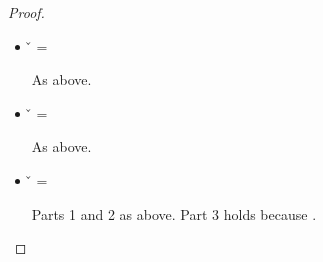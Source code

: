 \begin{lemma}
\begin{proof}
\begin{case}[T-App]
\begin{itemize}
\begin{subcase}[B-Delta]
\begin{itemize}
\begin{subcase}[\const{} = \classconst]
\begin{itemize}
\begin{subcase}[\v{2} = {\closure {\openv{}} {\abs {\x{}} {\t{}} {\e{}}}}]
              As above.
                  \end{subcase}
          \item[] \begin{subcase}[\v{2} = {\multi {\v{d}} {\disptable{}}}] \v{} = \HMapInstance{}


              As above.
                  \end{subcase}
          \item[] \begin{subcase}[\v{2} = {\curlymapvaloverright{\v{1}}{\v{2}}}] \v{} = \Keyword{}


              As above.
                  \end{subcase}
          \item[] \begin{subcase}[\v{2} = {\nil{}}] \v{} = \nil{}

             Parts 1 and 2 as above.
                    Part 3 holds because {}.
                  \end{subcase}
        \end{itemize}
      \end{subcase}


  \end{itemize}


\end{subcase}
\end{itemize}
\end{case}
\end{proof}
\end{lemma}
